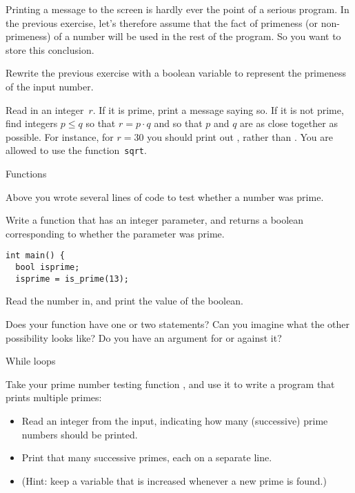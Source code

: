 Printing a message to the screen is hardly ever the point of a serious program.
In the previous exercise, let's therefore assume that the fact of primeness
(or non-primeness)
of a number
will be used in the rest of the program. So you want to store this conclusion.

\begin{exercise}
  \label{ex:prime:test2}
  Rewrite the previous exercise with a boolean variable to represent
  the primeness of the input number.
\end{exercise}

\begin{exercise}
  \label{ex:squaregrid}
  Read in an integer~$r$. If it is prime, print a message saying so.
  If it is not prime, find integers $p\leq q$ so that $r=p\cdot q$ and so
  that $p$ and $q$ are as close together as possible.
  For instance, for $r=30$ you should print out , rather than
  . You are allowed to use the function~\lstinline{sqrt}.
\end{exercise}

 {Functions}


Above you wrote several lines of code to test whether a number was
prime.

\begin{exercise}
  \label{ex:prime:func}
  Write a function  that has an integer parameter, and returns a boolean
  corresponding to whether the parameter was prime.
\begin{lstlisting}
int main() {
  bool isprime;
  isprime = is_prime(13);
\end{lstlisting}
  Read the number in, and print the value of the boolean.

  Does your function have one or two  statements?
  Can you imagine what the other possibility looks like?
  Do you have an argument for or against it?
\end{exercise}

 {While loops}


\begin{exercise}
  \label{ex:prime:while}
  Take your prime number testing function , and use it to
  write a program that prints multiple primes:
  \begin{itemize}
  \item Read an integer  from the input, indicating how
    many (successive) prime numbers should be printed.
  \item Print that many successive primes, each on a separate line.
  \item (Hint: keep a variable
     that is increased whenever a new prime is found.)
  \end{itemize}
\end{exercise}

